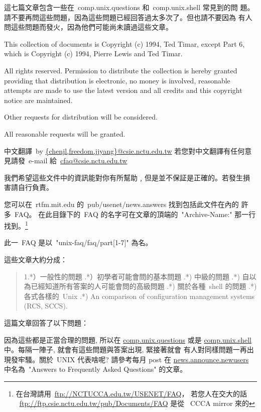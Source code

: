 \documentclass{article}
\begin{document}
\begin{CJK*}{Bg5}{ming} 
這七篇文章包含一些在~comp.unix.questions 和~comp.unix.shell 常見到的問
題。請不要再問這些問題，因為這些問題已經回答過太多次了。但也請不要因為
有人問這些問題而發火，因為他們可能尚未讀過這些文章。

This collection of documents is Copyright (c) 1994, Ted Timar, except 
Part 6, which is Copyright (c) 1994, Pierre Lewis and Ted Timar.

All rights reserved. Permission to distribute the collection is 
hereby granted providing that distribution is electronic, no money is 
involved, reasonable attempts are made to use the latest version and 
all credits and this copyright notice are maintained.

Other requests for distribution will be considered.

All reasonable requests will be granted.

中文翻譯~by \url{{chenjl,freedom,jjyang}@csie.nctu.edu.tw}
若您對中文翻譯有任何意見請發~e-mail 給~\url{cfaq@csie.nctu.edu.tw}

我們希望這些文件中的資訊能對你有所幫助﹐但是並不保証是正確的。若發生損
害請自行負責。

您可以在~rtfm.mit.edu 的~pub/usenet/news.answers 找到包括此文件在內的
許多~FAQ。 在此目錄下的~FAQ 的名字可在文章的頂端的~"Archive-Name:" 
那一行找到。\footnote{ 在台灣請用~\url{ftp://NCTUCCA.edu.tw/USENET/FAQ}，
若您人在交大的話 ~\url{ftp://ftp.csie.nctu.edu.tw/pub/Documents/FAQ} 是從
~CCCA mirror  來的}

此一~FAQ 是以~"unix-faq/faq/part[1-7]" 為名。

這些文章大約分成：
\begin{quote} 
      1.*）一般性的問題 .*）初學者可能會問的基本問題 .*) 中級的問題 .*) 自以為已經知道所有答案的人可能會問的高級問題 .*) 關於各種~shell 的問題 .*) 各式各樣的~Unix .*) An comparison of configuration management systems (RCS, SCCS).
\end{quote}
這篇文章回答了以下問題：
\tableofcontents

因為這些都是正當合理的問題, 所以在 \url{comp.unix.questions} 或是 
\url{comp.unix.shell} 中。每隔一陣子, 就會有這些問題與答案出現, 緊接著就會
有人對同樣問題一再出現發牢騷。關於~UNIX 代表啥呢? 請參考每月 post 在 
\url{news.announce.newusers} 中名為~"Answers to Frequently Asked Questions" 
的文章。


\end{CJK*}
\end{document}
